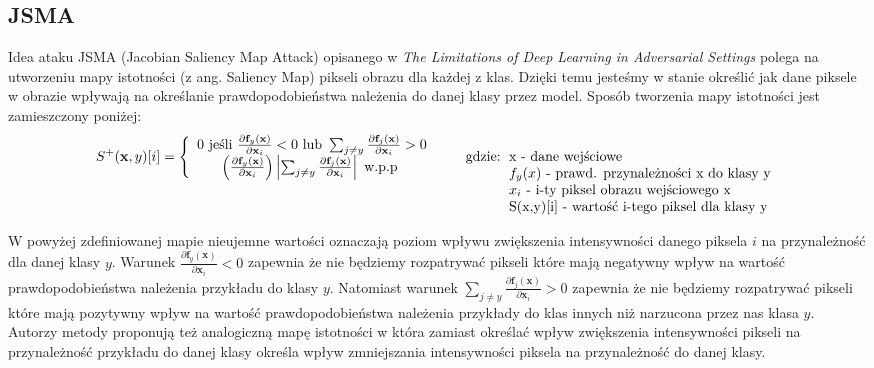 \documentclass[
    left=2.5cm,         %
    right=2.5cm,        %
    top=2.5cm,          %
    bottom=3cm,         %
    bindingoffset=6mm,  %
    nohyphenation=false %
]{eiti/eiti-thesis}
\begin{document}
\subsection{JSMA}
Idea ataku JSMA (Jacobian Saliency Map Attack) opisanego w
\textit{The Limitations of Deep Learning in Adversarial Settings}\cite{DBLP:journals/corr/PapernotMJFCS15}
polega na utworzeniu mapy istotności (z ang. Saliency Map) pikseli obrazu dla każdej z klas.
Dzięki temu jesteśmy w stanie określić jak dane piksele w obrazie wpływają na określanie prawdopodobieństwa należenia
do danej klasy przez model. Sposób tworzenia mapy istotności jest zamieszczony poniżej:
\begin{equation}\label{jsma+}
S^{+} ( \mathbf { x } , y ) [ i ] = \left\{ \begin{array} { c } { 0 \text { jeśli } \frac { \partial \mathbf {f} _ { y } ( \mathbf {x} ) } { \partial \mathbf {x} _ { i } } < 0 \text { lub } \sum _ { j \neq y } \frac { \partial \mathbf {f} _ { j } ( \mathbf {x} ) } { \partial \mathbf {x} _ { i } } > 0 } \\ { \left( \frac { \partial \mathbf {f} _ { y } ( \mathbf {x} ) } { \partial \mathbf {x} _ { i } } \right) \left| \sum _ { j \neq y } \frac { \partial \mathbf {f} _ { j } ( \mathbf {x} ) } { \partial \mathbf {x} _ { i } } \right| \text { w.p.p } } \end{array} \right.
\qquad\text{gdzie:}
\begin{tabular}[t]{ll}
x - dane wejściowe \\
${f} _ { y } ({x})$ - prawd. przynależności x do klasy y \\
$x_{i}$ - i-ty piksel obrazu wejściowego x \\
S({x},y)[i] - wartość i-tego piksel dla klasy y
\end{tabular}
\end{equation}

W powyżej zdefiniowanej mapie nieujemne wartości oznaczają poziom wpływu zwiększenia intensywności danego piksela $i$
na przynależność dla danej klasy $y$.
Warunek $\frac { \partial \mathbf {f} _ { y } ( \mathbf {x} ) } { \partial \mathbf {x} _ { i } } < 0$
zapewnia że nie będziemy rozpatrywać pikseli które mają negatywny wpływ na wartość prawdopodobieństwa należenia przykładu
do klasy $y$.
Natomiast warunek $\sum _ { j \neq y } \frac { \partial \mathbf {f} _ { j } ( \mathbf {x} ) } { \partial \mathbf {x} _ { i } } > 0 $
zapewnia że nie będziemy rozpatrywać pikseli które mają pozytywny wpływ na wartość prawdopodobieństwa należenia przykłady do klas
innych niż narzucona przez nas klasa $y$. Autorzy metody proponują też analogiczną mapę istotności w która
zamiast określać wpływ zwiększenia intensywności pikseli na przynależność przykładu do danej klasy określa wpływ zmniejszania
intensywności piksela na przynależność do danej klasy.
\end{document}
